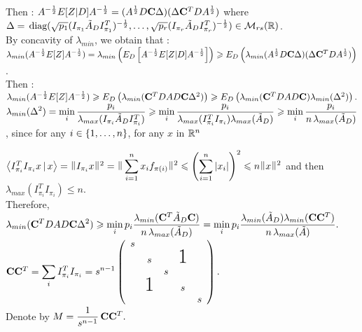 Then : $A^{-\frac12}E[Z|D]A^{-\frac12} = (A^{\frac 12} D \bold{C} \Delta)(\Delta \bold{C}^{T} D A^{\frac 12})$ where \\$\Delta =  \,\text{diag}(\sqrt{p_{1}} (I_{\pi_{1}}\tilde{A}_{D} I_{\pi_{1}}^{T})^{-\frac 12},\dots, \sqrt{p_{r}}(I_{\pi_{r}} \tilde{A}_{D} I_{\pi_{r}}^{T})^{-\frac 12}) \in {\mathcal M}_{r s}({\mathbb R})$.\\

By concavity of $\lambda_{min}$, we obtain that :\\

$\lambda_{min}(A^{-\frac12}E[Z]A^{-\frac12} ) = \lambda_{min} \left(E_{D}\left[A^{-\frac12}E[Z|D]A^{-\frac12}\right] \right) \geqslant E_{D} \left(\lambda_{min} (A^{\frac 12} D \bold{C} \Delta)(\Delta \bold{C}^{T} D A^{\frac 12}) \right)$.\\

Then :\\
$\lambda_{min}(A^{-\frac12}E[Z]A^{-\frac12} ) \geqslant E_{D} \left(\lambda_{min} (\bold{C}^{T} D A D \bold{C} \Delta^{2})\right) \geqslant E_{D} \left(\lambda_{min} (\bold{C}^{T} D A D \bold{C})\lambda_{min} (\Delta^{2})\right).$\\

$\displaystyle \lambda_{min}(\Delta^{2}) =  \min_{i}  \frac{p_{i}}{\lambda_{max}(I_{\pi_{i}} \tilde{A}_{D} I_{\pi_{i}}^{T} ) } \geqslant  \min_{i}\frac{p_{i} }{\lambda_{max}(I_{\pi_{i}}^{T} I_{\pi_{i}}) \lambda_{max}(\tilde{A}_{D})}  \geqslant \min_{i}\frac{ p_{i} }{n\, \lambda_{max}(\tilde{A}_{D})} $, 
since for any $i\in \left\{1,\dots,n\right\}$, for any $x$ in ${\mathbb R}^{n}$ 

$\scal{I_{\pi_{i}}^{T} I_{\pi_{i}} x }{x} = \norm{ I_{\pi_{i}}x }^{2} = \norm{\dsp\sum_{i=1}^{n} x_{i}f_{\pi(i)} }^{2} \leq \pare{\dsp\sum_{i=1}^{n} \abs{x_{i}}}^{2} \leq n\norm{x}^{2}$
 and then $\lambda_{max}( I_{\pi_{i}}^{T} I_{\pi_{i}}  ) \leq n$.\\
 
 Therefore, 
$\displaystyle \lambda_{min} (\bold{C}^{T} D A D \bold{C} \Delta^{2}) \geqslant  \min_{i} p_{i} \frac{\lambda_{min}(\bold{C}^{T}\tilde{A}_{D} \bold{C} )}{n \,\lambda_{max}(\tilde{A}_{D})}  =  \min_{i} p_{i} \frac{ \lambda_{min}(\tilde{A}_{D}) \lambda_{min}(\bold{C} \bold{C}^{T} )}{n \,\lambda_{max}(\tilde{A})}.$\\

$\bold{C} \bold{C}^{T}= \dsp\sum\limits_{i} I_{\pi_{i}}^{T} I_{\pi_{i}} = s^{n-1}
    \left(
    \begin{array}{ccccc}
    s                                    \\
      & s             &   & \text{\huge1}\\
      &               & s                \\
      & \text{\huge1} &   & s            \\
      &               &   &   & s
    \end{array}
    \right).$\\
Denote by $\displaystyle M = \frac{1}{s^{n-1}}\, \bold{C} \bold{C}^{T}.$\\

